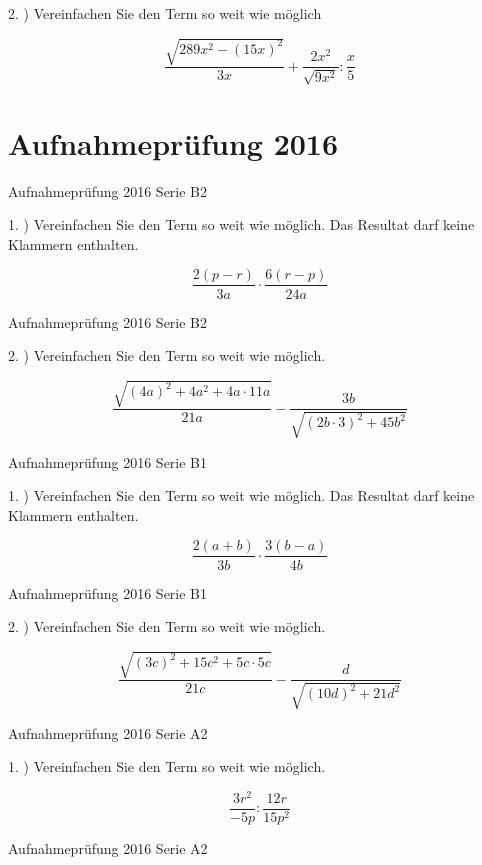 2. ) Vereinfachen Sie den Term so weit wie möglich

$$\frac{\sqrt{289x^2 - (15x)^2}}{3x} + \frac{2x^2}{\sqrt{9x^2}} : \frac{x}5$$

\section*{Aufnahmeprüfung 2016}
Aufnahmeprüfung 2016 Serie B2

1. ) Vereinfachen Sie den Term so weit wie möglich. Das Resultat darf
keine Klammern enthalten.

$$ \frac{2(p-r)}{3a} \cdot{} \frac{6(r-p)}{24a}$$


Aufnahmeprüfung 2016 Serie B2

2. ) Vereinfachen Sie den Term so weit wie möglich.

$$\frac{\sqrt{(4a)^2+4a^2+4a\cdot{}11a}}{21a} - \frac{3b}{\sqrt{(2b\cdot{}3)^2+45b^2}}$$


Aufnahmeprüfung 2016 Serie B1

1. ) Vereinfachen Sie den Term so weit wie möglich. Das Resultat darf
keine Klammern enthalten.

$$\frac{2(a+b)}{3b} \cdot{} \frac{3(b-a)}{4b}$$


Aufnahmeprüfung 2016 Serie B1

2. ) Vereinfachen Sie den Term so weit wie möglich. 

$$\frac{\sqrt{(3c)^2+15c^2+5c\cdot{}5c}}{21c} - \frac{d}{\sqrt{(10d)^2 + 21d^2}}$$


Aufnahmeprüfung 2016 Serie A2

1. ) Vereinfachen Sie den Term so weit wie möglich. 

$$\frac{3r^2}{-5p} : \frac{12r}{15p^2}$$


Aufnahmeprüfung 2016 Serie A2

